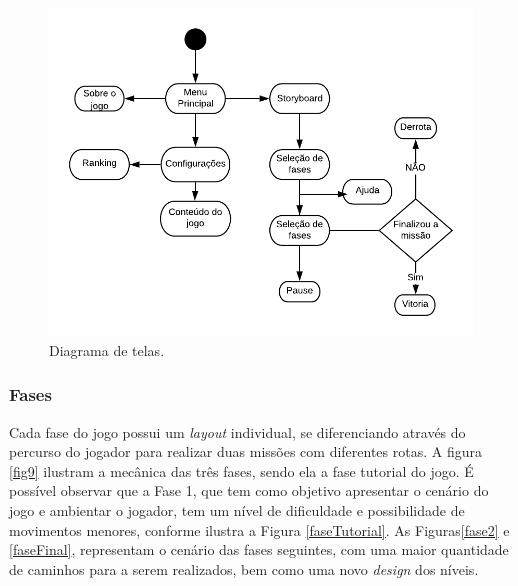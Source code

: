 \documentclass[10pt, conference, compsocconf]{IEEEtran}
\begin{document}
\begin{figure}[htbp]
		\centering
		\includegraphics[width=.4\textwidth]{Figuras/Diagrama.png}
		\caption{Diagrama de telas.}\label{diagramaTelas}	
\end{figure}

\subsubsection{Fases}\label{GDD}
Cada fase do jogo possui um \textit{layout} individual, se diferenciando através do percurso do jogador para realizar duas missões com diferentes rotas. A figura \ref{fig9} ilustram a mecânica das três fases, sendo ela a fase tutorial do jogo. É possível observar que a Fase 1, que tem como objetivo apresentar o cenário do jogo e ambientar o jogador, tem um nível de dificuldade e possibilidade de movimentos menores, conforme ilustra a Figura \ref{faseTutorial}. As Figuras\ref{fase2} e \ref{faseFinal}, representam o cenário das fases seguintes, com uma maior quantidade de caminhos para a serem realizados, bem como uma novo \textit{design} dos níveis.
\end{document}
